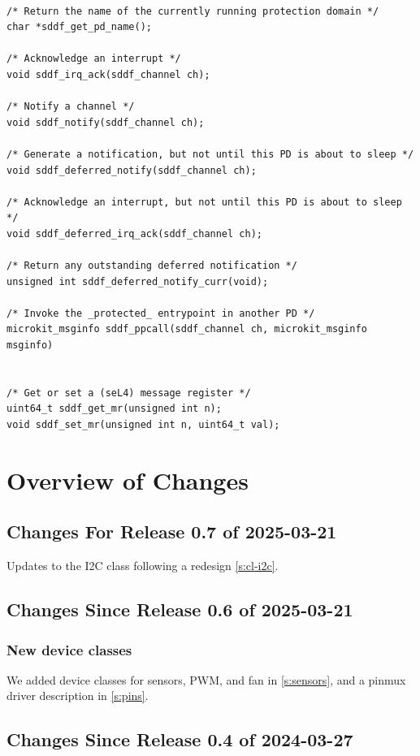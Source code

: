 \documentclass[a4paper,12pt]{report}
\begin{document}
\begin{lstlisting}[firstline=2,float=th,tabsize=2,
  label={l:sddf-interface},
  caption={sDDF interface functions.}]

/* Return the name of the currently running protection domain */
char *sddf_get_pd_name();

/* Acknowledge an interrupt */
void sddf_irq_ack(sddf_channel ch);

/* Notify a channel */
void sddf_notify(sddf_channel ch);

/* Generate a notification, but not until this PD is about to sleep */
void sddf_deferred_notify(sddf_channel ch);

/* Acknowledge an interrupt, but not until this PD is about to sleep */
void sddf_deferred_irq_ack(sddf_channel ch);

/* Return any outstanding deferred notification */
unsigned int sddf_deferred_notify_curr(void);

/* Invoke the _protected_ entrypoint in another PD */
microkit_msginfo sddf_ppcall(sddf_channel ch, microkit_msginfo msginfo)


/* Get or set a (seL4) message register */
uint64_t sddf_get_mr(unsigned int n);
void sddf_set_mr(unsigned int n, uint64_t val);
\end{lstlisting}

\chapter{Overview of Changes}

\section{Changes For Release 0.7 of 2025-03-21}

Updates to the I2C class following a redesign \autoref{s:cl-i2c}.

\section{Changes Since Release 0.6 of 2025-03-21}
\subsection{New device classes}
We added device classes for sensors, PWM, and fan in \autoref{s:sensors},
and a pinmux driver description in  \autoref{s:pins}.

\section{Changes Since Release 0.4 of 2024-03-27}
\end{document}
